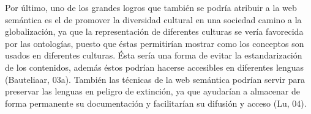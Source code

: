 Por último, uno de los grandes logros que también se podría atribuir a la web semántica es el de promover la diversidad cultural en una sociedad camino a la globalización, ya que la representación de diferentes culturas se vería favorecida por las ontologías, puesto que éstas permitirían mostrar como los conceptos son usados en diferentes culturas. Ésta sería una forma de evitar la estandarización de los contenidos, además éstos podrían hacerse accesibles en diferentes lenguas (Bauteliaar, 03a). También las técnicas de la web semántica podrían servir para preservar las lenguas en peligro de extinción, ya que ayudarían a almacenar de forma permanente su documentación y facilitarían su difusión y acceso (Lu, 04).




















